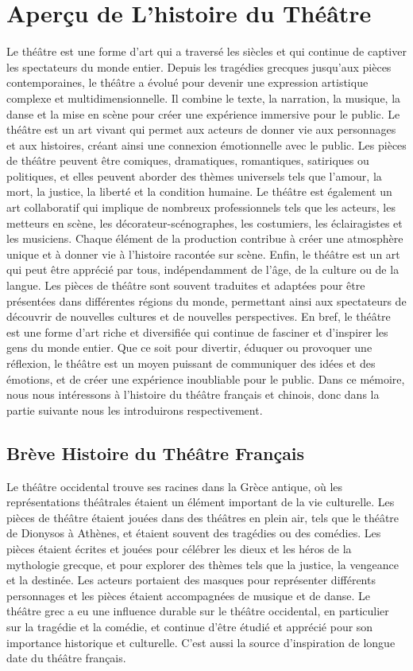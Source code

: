 \documentclass[UTF8,a4paper,12pt]{ctexart}
\numberwithin{equation}{section}
\begin{document}
\section{Aperçu de L'histoire du Théâtre}
\hspace{8mm}
Le théâtre est une forme d'art qui a traversé les siècles et qui continue de captiver les spectateurs du monde entier. Depuis les tragédies grecques jusqu'aux pièces contemporaines, le théâtre a évolué pour devenir une expression artistique complexe et multidimensionnelle. Il combine le texte, la narration, la musique, la danse et la mise en scène pour créer une expérience immersive pour le public. Le théâtre est un art vivant qui permet aux acteurs de donner vie aux personnages et aux histoires, créant ainsi une connexion émotionnelle avec le public. Les pièces de théâtre peuvent être comiques, dramatiques, romantiques, satiriques ou politiques, et elles peuvent aborder des thèmes universels tels que l'amour, la mort, la justice, la liberté et la condition humaine. Le théâtre est également un art collaboratif qui implique de nombreux professionnels tels que les acteurs, les metteurs en scène, les décorateur-scénographes, les costumiers, les éclairagistes et les musiciens. Chaque élément de la production contribue à créer une atmosphère unique et à donner vie à l'histoire racontée sur scène. Enfin, le théâtre est un art qui peut être apprécié par tous, indépendamment de l'âge, de la culture ou de la langue. Les pièces de théâtre sont souvent traduites et adaptées pour être présentées dans différentes régions du monde, permettant ainsi aux spectateurs de découvrir de nouvelles cultures et de nouvelles perspectives. 
En bref, le théâtre est une forme d'art riche et diversifiée qui continue de fasciner et d'inspirer les gens du monde entier. Que ce soit pour divertir, éduquer ou provoquer une réflexion, le théâtre est un moyen puissant de communiquer des idées et des émotions, et de créer une expérience inoubliable pour le public. Dans ce mémoire, nous nous intéressons à l'histoire du théâtre français et chinois, donc dans la partie suivante nous les introduirons respectivement.

\subsection{Brève Histoire du Théâtre Français}

Le théâtre occidental trouve ses racines dans la Grèce antique, où les représentations théâtrales étaient un élément important de la vie culturelle. Les pièces de théâtre étaient jouées dans des théâtres en plein air, tels que le théâtre de Dionysos à Athènes, et étaient souvent des tragédies ou des comédies. Les pièces étaient écrites et jouées pour célébrer les dieux et les héros de la mythologie grecque, et pour explorer des thèmes tels que la justice, la vengeance et la destinée. Les acteurs portaient des masques pour représenter différents personnages et les pièces étaient accompagnées de musique et de danse. Le théâtre grec a eu une influence durable sur le théâtre occidental, en particulier sur la tragédie et la comédie, et continue d'être étudié et apprécié pour son importance historique et culturelle. C'est aussi la source d'inspiration de longue date du théâtre français. 
\end{document}
